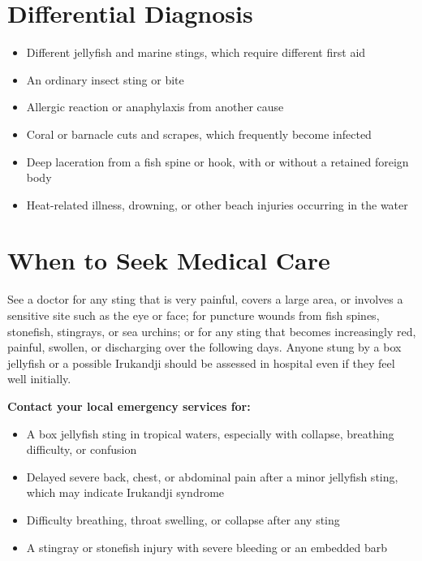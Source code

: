 \section*{Differential Diagnosis}
\begin{itemize}
    \item Different jellyfish and marine stings, which require different first aid
    \item An ordinary insect sting or bite
    \item Allergic reaction or anaphylaxis from another cause
    \item Coral or barnacle cuts and scrapes, which frequently become infected
    \item Deep laceration from a fish spine or hook, with or without a retained foreign body
    \item Heat-related illness, drowning, or other beach injuries occurring in the water
\end{itemize}

\section*{When to Seek Medical Care}
See a doctor for any sting that is very painful, covers a large area, or involves a sensitive site such as the eye or face; for puncture wounds from fish spines, stonefish, stingrays, or sea urchins; or for any sting that becomes increasingly red, painful, swollen, or discharging over the following days. Anyone stung by a box jellyfish or a possible Irukandji should be assessed in hospital even if they feel well initially.

\textbf{Contact your local emergency services for:}
\begin{itemize}
    \item A box jellyfish sting in tropical waters, especially with collapse, breathing difficulty, or confusion
    \item Delayed severe back, chest, or abdominal pain after a minor jellyfish sting, which may indicate Irukandji syndrome
    \item Difficulty breathing, throat swelling, or collapse after any sting
    \item A stingray or stonefish injury with severe bleeding or an embedded barb
\end{itemize}

